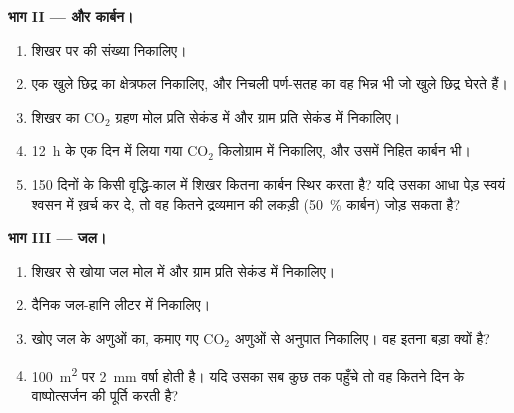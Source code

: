 \begin{problem}
\medskip
\noindent\textbf{भाग II ---  और कार्बन।}
\begin{enumerate}[resume]
  \item शिखर पर  की संख्या निकालिए।
  \item एक खुले छिद्र का क्षेत्रफल निकालिए, और निचली पर्ण-सतह का वह
        भिन्न भी जो खुले छिद्र घेरते हैं।
  \item शिखर का $\mathrm{CO_2}$ ग्रहण मोल प्रति सेकंड में और ग्राम
        प्रति सेकंड में निकालिए।
  \item \qty{12}{h} के एक दिन में लिया गया $\mathrm{CO_2}$ किलोग्राम
        में निकालिए, और उसमें निहित कार्बन भी।
  \item \qty{150}{} दिनों के किसी वृद्धि-काल में शिखर कितना कार्बन
        स्थिर करता है? यदि उसका आधा पेड़ स्वयं श्वसन में ख़र्च कर दे,
        तो वह कितने द्रव्यमान की लकड़ी (\qty{50}{\%} कार्बन) जोड़ सकता
        है?
\end{enumerate}

\medskip
\noindent\textbf{भाग III --- जल।}
\begin{enumerate}[resume]
  \item शिखर से खोया जल मोल में और ग्राम प्रति सेकंड में निकालिए।
  \item दैनिक जल-हानि लीटर में निकालिए।
  \item खोए जल के अणुओं का, कमाए गए $\mathrm{CO_2}$ अणुओं से अनुपात
        निकालिए। वह इतना बड़ा क्यों है?
  \item \qty{100}{m^2} पर \qty{2}{mm} वर्षा होती है। यदि उसका सब कुछ
         तक पहुँचे तो वह कितने दिन के वाष्पोत्सर्जन की पूर्ति करती
        है?
\end{enumerate}


\end{problem}
